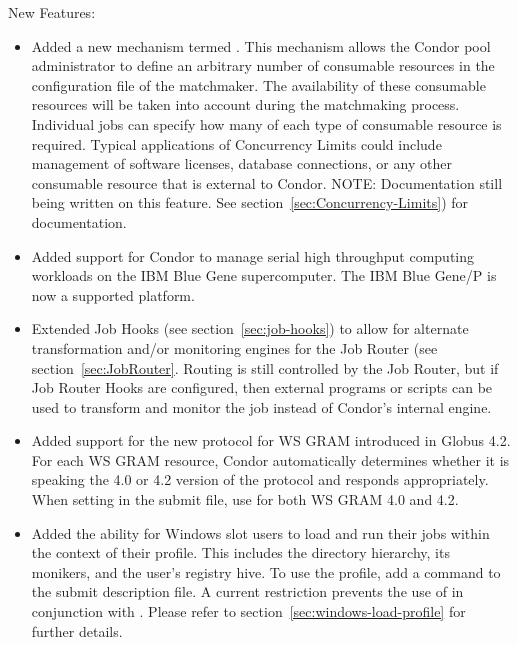 \noindent New Features:

\begin{itemize}

\item Added a new mechanism termed .  This
mechanism allows the Condor pool administrator to define an arbitrary
number of consumable resources in the configuration file of the
matchmaker.  The availability of these consumable resources will be taken
into account during the matchmaking process.  Individual jobs can specify
how many of each type of consumable resource is required.  
Typical applications of Concurrency Limits could include management of
software licenses, database connections, or any other consumable resource
that is external to Condor.  NOTE: Documentation still being written on
this feature.
See section~\ref{sec:Concurrency-Limits}) for documentation.

\item Added support for Condor to manage serial high throughput computing
workloads on the IBM Blue Gene supercomputer.  The IBM Blue Gene/P is now
a supported platform.

\item Extended Job Hooks (see section~\ref{sec:job-hooks}) to allow for
alternate transformation and/or monitoring engines for the Job Router (see
section~\ref{sec:JobRouter}.  Routing is still controlled by the Job
Router, but if Job Router Hooks are configured, then external programs or
scripts can be used to transform and monitor the job instead of Condor's
internal engine.

\item Added support for the new protocol for WS GRAM introduced in Globus
4.2. For each WS GRAM resource, Condor automatically determines whether it is
speaking the 4.0 or 4.2 version of the protocol and responds appropriately.
When setting  in the submit file, use
 for both WS GRAM 4.0 and 4.2.

\item Added the ability for Windows slot users to load and run their jobs
within the context of their profile. 
This includes the  directory 
hierarchy, its monikers, and the user's registry hive.
To use the profile, add a  command to the 
submit description file.  A current restriction prevents the use of
in conjunction with . Please refer to 
section~\ref{sec:windows-load-profile} for further details.


\end{itemize}
